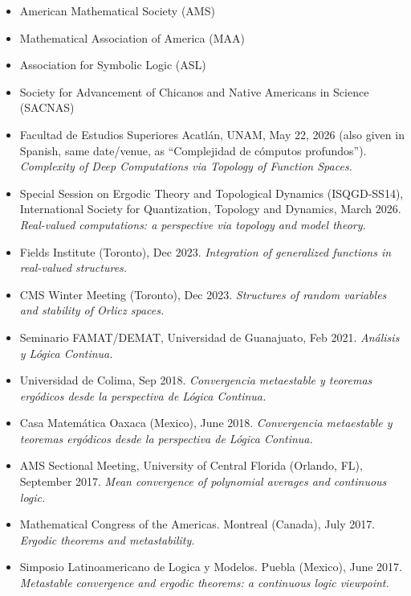 \documentclass[11pt,a4paper,ragged2e,withhyper]{altacv}
\begin{document}
\begin{itemize}
  \item American Mathematical Society (AMS)
  \item Mathematical Association of America (MAA)
  \item Association for Symbolic Logic (ASL)
  \item Society for Advancement of Chicanos and Native Americans in Science (SACNAS)
\end{itemize}

{\footnotesize
\begin{itemize}
\item Facultad de Estudios Superiores Acatlán, UNAM, May 22, 2026 (also given in Spanish, same date/venue, as ``Complejidad de cómputos profundos'').
  \emph{Complexity of Deep Computations via Topology of Function Spaces.}
\item Special Session on Ergodic Theory and Topological Dynamics (ISQGD-SS14), International Society for Quantization, Topology and Dynamics, March 2026.
  \emph{Real-valued computations: a perspective via topology and model theory.}
\item Fields Institute (Toronto), Dec 2023.
  \emph{Integration of generalized functions in real-valued structures.}
\item CMS Winter Meeting (Toronto), Dec 2023.
  \emph{Structures of random variables and stability of Orlicz spaces.}
\item Seminario FAMAT/DEMAT, Universidad de Guanajuato, Feb 2021.
  \emph{Análisis y Lógica Continua.}
\item Universidad de Colima, Sep 2018.
  \emph{Convergencia metaestable y teoremas ergódicos desde la perspectiva de Lógica Continua.}
\item Casa Matemática Oaxaca (Mexico), June 2018.
  \emph{Convergencia metaestable y teoremas ergódicos desde la perspectiva de Lógica Continua.}
\item AMS Sectional Meeting, University of Central Florida (Orlando, FL), September 2017.
  \emph{Mean convergence of polynomial averages and continuous logic.}
\item Mathematical Congress of the Americas.  Montreal (Canada), July 2017.
  \emph{Ergodic theorems and metastability.}
\item Simposio Latinoamericano de Logica y Modelos. Puebla (Mexico), June 2017.
  \emph{Metastable convergence and ergodic theorems: a continuous logic viewpoint.}

\end{itemize}}
\end{document}
